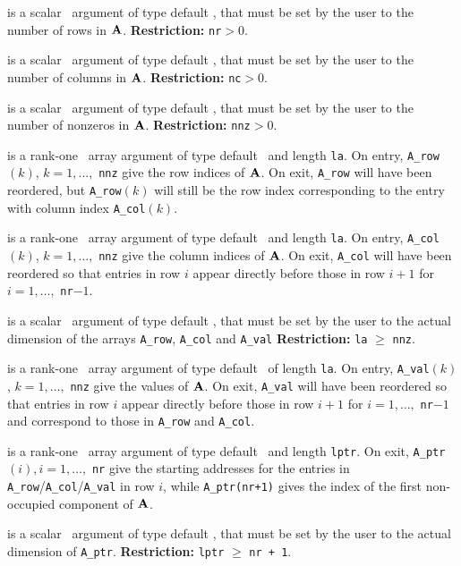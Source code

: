 \documentclass{galahad}
\begin{document}
\begin{description}

 is a scalar \intentin\ argument of type default
\integer, that must be set by the user to the number of
rows in ${\mathbf{A}}$.
{\bf Restriction:} {\tt nr}$ > 0$.

 is a scalar \intentin\ argument of type default
\integer, that must be set by the user to the number of
columns in ${\mathbf{A}}$.
{\bf Restriction:} {\tt nc}$ > 0$.

 is a scalar \intentin\ argument of type default
\integer, that must be set by the user to the number of
nonzeros in ${\mathbf{A}}$.
{\bf Restriction:} {\tt nnz}$ > 0$.

  is a rank-one \intentinout\ array argument of type default
\integer\ and length {\tt la}.
On entry, {\tt A\_row}$(k)$, $k = 1, \ldots,$ {\tt nnz} give
the row indices of ${\mathbf{A}}$. On exit, {\tt A\_row} will have been reordered, but
{\tt A\_row}$(k)$ will still be the row index corresponding to the
entry with column index {\tt A\_col}$(k)$.

  is a rank-one \intentinout\ array argument of type default
\integer\ and length {\tt la}.
On entry, {\tt A\_col}$(k)$, $k = 1, \ldots,$ {\tt nnz} give
the column indices of ${\mathbf{A}}$. On exit, {\tt A\_col}
will have been reordered so that entries in row $i$ appear directly before
those in row $i+1$ for $i = 1, \ldots ,$ {\tt nr}$-1$.

is a scalar \intentin\ argument of type default
\integer, that must be set by the user to the actual dimension of the arrays
{\tt A\_row},
{\tt A\_col}
and
{\tt A\_val}
{\bf Restriction:} {\tt la} $\geq$ {\tt nnz}.

is a rank-one \intentinout\ array argument of type default
\realdp\ of length {\tt la}.
On entry, {\tt A\_val}$(k)$, $k = 1, \ldots,$ {\tt nnz} give the
values of ${\mathbf{A}}$.
On exit, {\tt A\_val} will have been reordered so that
entries in row $i$ appear directly before those in row $i+1$ for
$i = 1, \ldots,$ {\tt nr}$-1$ and correspond to those in
{\tt A\_row} and {\tt A\_col}.

  is a rank-one \intentout\ array argument of type default
\integer\ and length {\tt lptr}.
On exit, {\tt A\_ptr}$(i), i = 1, \ldots,$ {\tt nr} give
the starting addresses for the entries in {\tt A\_row}/{\tt A\_col}/{\tt A\_val}
in row $i$, while {\tt A\_ptr(nr+1)}
gives the index of the first non-occupied component of ${\mathbf{A}}$.

 is a scalar \intentin\ argument of type default
\integer, that must be set by the user to the
actual dimension of {\tt A\_ptr}.
{\bf Restriction:} {\tt lptr} $\geq$ {\tt nr + 1}.


\end{description}
\end{document}

